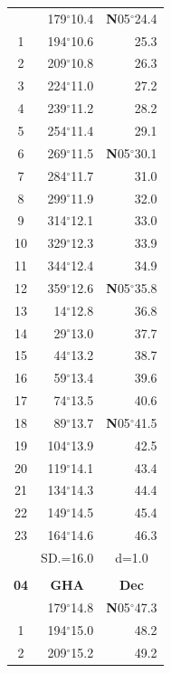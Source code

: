 \documentclass[10pt, a4paper]{report}
\begin{document}
\begin{scriptsize}
\begin{tabular*}{0.2\textwidth}[t]{@{\extracolsep{\fill}}|c|rr|}
\hline\rule{0pt}{2.6ex}\noindent
0 & 179$^\circ$10.4 & \textbf{N}05$^\circ$24.4\\
1 & 194$^\circ$10.6 & 25.3\\
2 & 209$^\circ$10.8 & 26.3\\
3 & 224$^\circ$11.0 & \raisebox{0.24ex}{\boldmath$\cdot$~\boldmath$\cdot$~~}27.2\\
4 & 239$^\circ$11.2 & 28.2\\
5 & 254$^\circ$11.4 & 29.1\\[2Pt]
6 & 269$^\circ$11.5 & \textbf{N}05$^\circ$30.1\\
7 & 284$^\circ$11.7 & 31.0\\
8 & 299$^\circ$11.9 & 32.0\\
9 & 314$^\circ$12.1 & \raisebox{0.24ex}{\boldmath$\cdot$~\boldmath$\cdot$~~}33.0\\
10 & 329$^\circ$12.3 & 33.9\\
11 & 344$^\circ$12.4 & 34.9\\[2Pt]
12 & 359$^\circ$12.6 & \textbf{N}05$^\circ$35.8\\
13 & 14$^\circ$12.8 & 36.8\\
14 & 29$^\circ$13.0 & 37.7\\
15 & 44$^\circ$13.2 & \raisebox{0.24ex}{\boldmath$\cdot$~\boldmath$\cdot$~~}38.7\\
16 & 59$^\circ$13.4 & 39.6\\
17 & 74$^\circ$13.5 & 40.6\\[2Pt]
18 & 89$^\circ$13.7 & \textbf{N}05$^\circ$41.5\\
19 & 104$^\circ$13.9 & 42.5\\
20 & 119$^\circ$14.1 & 43.4\\
21 & 134$^\circ$14.3 & \raisebox{0.24ex}{\boldmath$\cdot$~\boldmath$\cdot$~~}44.4\\
22 & 149$^\circ$14.5 & 45.4\\
23 & 164$^\circ$14.6 & 46.3\\
\hline
\rule{0pt}{2.4ex} & \multicolumn{1}{c}{SD.=16.0} & \multicolumn{1}{c|}{d=1.0}\\
\hline
\multicolumn{1}{c}{}\\[-0.5ex]\hline
\multicolumn{1}{|c|}{\rule{0pt}{2.6ex}\textbf{04}} & \multicolumn{1}{c}{\textbf{GHA}} & \multicolumn{1}{c|}{\textbf{Dec}}\\
\hline\rule{0pt}{2.6ex}\noindent
0 & 179$^\circ$14.8 & \textbf{N}05$^\circ$47.3\\
1 & 194$^\circ$15.0 & 48.2\\
2 & 209$^\circ$15.2 & 49.2\\

\end{tabular*}
\end{scriptsize}
\end{document}
